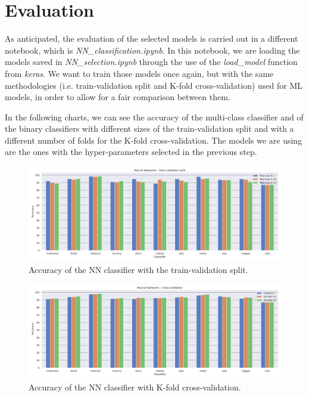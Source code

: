 \documentclass{Configuration_Files/PoliMi3i_thesis}
\begin{document}
\section{Evaluation}
\label{sec:eval}%
As anticipated, the evaluation of the selected models is carried out in a different notebook, which is \textit{NN\_classification.ipynb}. In this notebook, we are loading the models saved in \textit{NN\_selection.ipynb} through the use of the \textit{load\_model} function from \textit{keras}. We want to train those models once again, but with the same methodologies (i.e. train-validation split and K-fold cross-validation) used for ML models, in order to allow for a fair comparison between them.

In the following charts, we can see the accuracy of the multi-class classifier and of the binary classifiers with different sizes of the train-validation split and with a different number of folds for the K-fold cross-validation. The models we are using are the ones with the hyper-parameters selected in the previous step.

\begin{figure}[H]
    \centering
    \includegraphics[width=\textwidth]{Figures/nn_s.png}
    \caption{Accuracy of the NN classifier with the train-validation split.}
    \label{fig:nns}
\end{figure}

\begin{figure}[H]
    \centering
    \includegraphics[width=\textwidth]{Figures/nn_d.png}
    \caption{Accuracy of the NN classifier with K-fold cross-validation.}
    \label{fig:nnd}
\end{figure}
\end{document}
